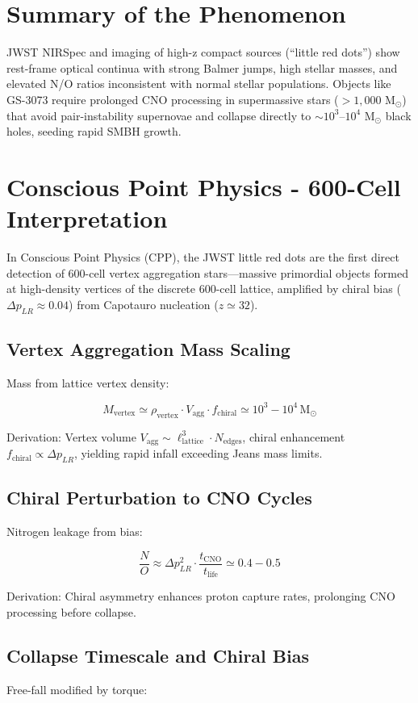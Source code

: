 \documentclass[11pt]{article}
\begin{document}
\section{Summary of the Phenomenon}
JWST NIRSpec and imaging of high-z compact sources (``little red dots'') show rest-frame optical continua with strong Balmer jumps, high stellar masses, and elevated N/O ratios inconsistent with normal stellar populations. Objects like GS-3073 require prolonged CNO processing in supermassive stars ($>1{,}000$ M$_\odot$) that avoid pair-instability supernovae and collapse directly to $\sim 10^3$--$10^4$ M$_\odot$ black holes, seeding rapid SMBH growth.

\section{Conscious Point Physics - 600-Cell Interpretation}
In Conscious Point Physics (CPP), the JWST little red dots are the first direct detection of 600-cell vertex aggregation stars—massive primordial objects formed at high-density vertices of the discrete 600-cell lattice, amplified by chiral bias ($\Delta p_{LR} \approx 0.04$) from Capotauro nucleation ($z \simeq 32$).

\subsection{Vertex Aggregation Mass Scaling}
Mass from lattice vertex density:

\[
M_{\text{vertex}} \simeq \rho_{\text{vertex}} \cdot V_{\text{agg}} \cdot f_{\text{chiral}} \simeq 10^3 - 10^4 \, \text{M}_\odot
\]

Derivation: Vertex volume $V_{\text{agg}} \sim \ell_{\text{lattice}}^3 \cdot N_{\text{edges}}$, chiral enhancement $f_{\text{chiral}} \propto \Delta p_{LR}$, yielding rapid infall exceeding Jeans mass limits.

\subsection{Chiral Perturbation to CNO Cycles}
Nitrogen leakage from bias:

\[
\frac{N}{O} \approx \Delta p_{LR}^2 \cdot \frac{t_{\text{CNO}}}{t_{\text{life}}} \simeq 0.4 - 0.5
\]

Derivation: Chiral asymmetry enhances proton capture rates, prolonging CNO processing before collapse.

\subsection{Collapse Timescale and Chiral Bias}
Free-fall modified by torque:
\end{document}
